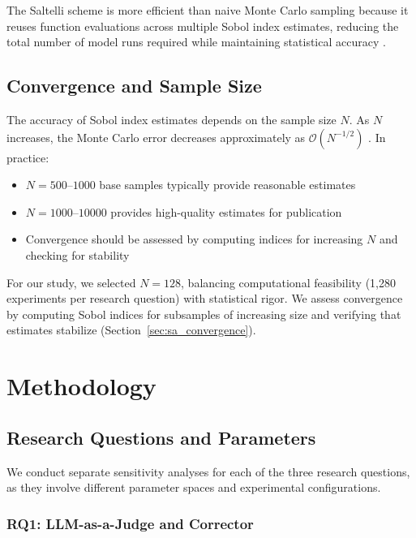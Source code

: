 The Saltelli scheme is more efficient than naive Monte Carlo sampling because it reuses function evaluations across multiple Sobol index estimates, reducing the total number of model runs required while maintaining statistical accuracy \citep{saltelli2010variance}.

\subsection{Convergence and Sample Size}

The accuracy of Sobol index estimates depends on the sample size $N$. As $N$ increases, the Monte Carlo error decreases approximately as $\mathcal{O}(N^{-1/2})$ \citep{saltelli2010variance}. In practice:

\begin{itemize}
    \item $N = 500$--$1000$ base samples typically provide reasonable estimates
    \item $N = 1000$--$10000$ provides high-quality estimates for publication
    \item Convergence should be assessed by computing indices for increasing $N$ and checking for stability
\end{itemize}

For our study, we selected $N = 128$, balancing computational feasibility (1,280 experiments per research question) with statistical rigor. We assess convergence by computing Sobol indices for subsamples of increasing size and verifying that estimates stabilize (Section~\ref{sec:sa_convergence}).

\section{Methodology}
\label{sec:sa_methodology}

\subsection{Research Questions and Parameters}

We conduct separate sensitivity analyses for each of the three research questions, as they involve different parameter spaces and experimental configurations.

\subsubsection{RQ1: LLM-as-a-Judge and Corrector}

